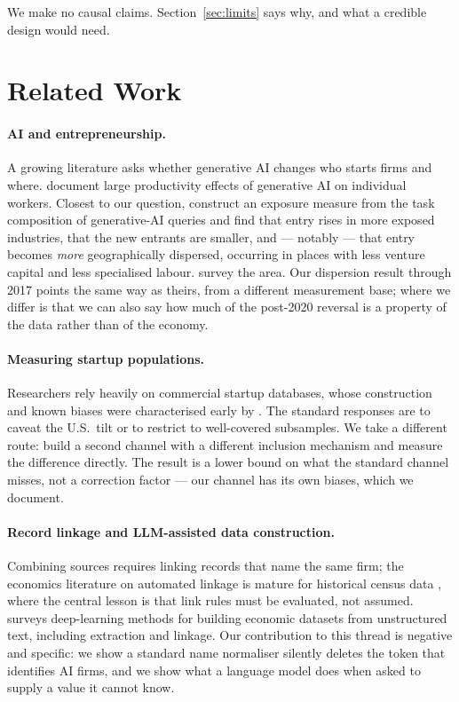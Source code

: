 \documentclass[11pt]{article}
\begin{document}
We make no causal claims. Section~\ref{sec:limits} says why, and what a
credible design would need.

\section{Related Work}

\paragraph{AI and entrepreneurship.} A growing literature asks whether
generative AI changes who starts firms and where. \citet{brynjolfsson2023genai}
document large productivity effects of generative AI on individual workers.
Closest to our question, \citet{bena2025prompted} construct an exposure measure
from the task composition of generative-AI queries and find that entry rises in
more exposed industries, that the new entrants are smaller, and --- notably ---
that entry becomes \emph{more} geographically dispersed, occurring in places
with less venture capital and less specialised labour.
\citet{fossen2024ai} survey the area. Our dispersion result through 2017 points
the same way as theirs, from a different measurement base; where we differ is
that we can also say how much of the post-2020 reversal is a property of the
data rather than of the economy.

\paragraph{Measuring startup populations.} Researchers rely heavily on
commercial startup databases, whose construction and known biases were
characterised early by \citet{dalle2017crunchbase}. The standard responses are
to caveat the U.S.\ tilt or to restrict to well-covered subsamples. We take a
different route: build a second channel with a different inclusion mechanism
and measure the difference directly. The result is a lower bound on what the
standard channel misses, not a correction factor --- our channel has its own
biases, which we document.

\paragraph{Record linkage and LLM-assisted data construction.} Combining
sources requires linking records that name the same firm; the economics
literature on automated linkage is mature for historical census data
\citep{abramitzky2021linking}, where the central lesson is that link rules must
be evaluated, not assumed. \citet{dell2025deep} surveys deep-learning methods
for building economic datasets from unstructured text, including extraction and
linkage. Our contribution to this thread is negative and specific: we show a
standard name normaliser silently deletes the token that identifies AI firms,
and we show what a language model does when asked to supply a value it cannot
know.
\end{document}
